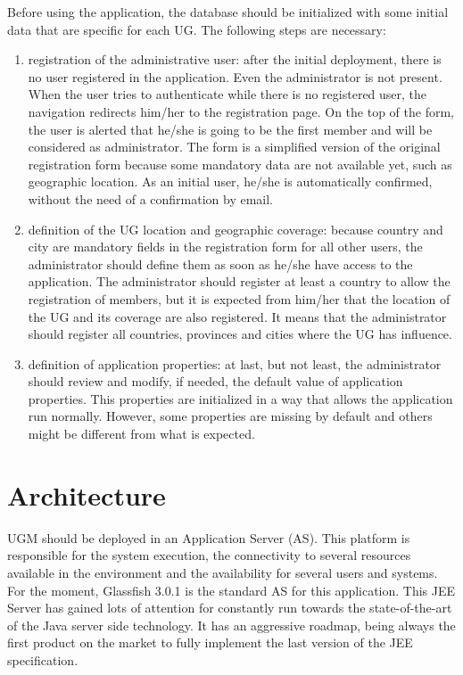 \documentclass[envcountsame,envcountchap]{svmono}
\begin{document}
Before using the application, the database should be initialized with some initial data that are specific for each UG. The following steps are necessary:

\begin{enumerate}
\item registration of the administrative user: after the initial deployment, there is no user registered in the application. Even the administrator is not present. When the user tries to authenticate while there is no registered user, the navigation redirects him/her to the registration page. On the top of the form, the user is alerted that he/she is going to be the first member and will be considered as administrator. The form is a simplified version of the original registration form because some mandatory data are not available yet, such as geographic location. As an initial user, he/she is automatically confirmed, without the need of a confirmation by email.
\item definition of the UG location and geographic coverage: because country and city are mandatory fields in the registration form for all other users, the administrator should define them as soon as he/she have access to the application. The administrator should register at least a country to allow the registration of members, but it is expected from him/her that the location of the UG and its coverage are also registered. It means that the administrator should register all countries, provinces and cities where the UG has influence.
\item definition of application properties: at last, but not least, the administrator should review and modify, if needed, the default value of application properties. This properties are initialized in a way that allows the application run normally. However, some properties are missing by default and others might be different from what is expected.
\end{enumerate}

\chapter{Architecture}

UGM should be deployed in an Application Server (AS). This platform is responsible for the system execution, the connectivity to several resources available in the environment and the availability for several users and systems. For the moment, Glassfish 3.0.1 is the standard AS for this application. This JEE Server has gained lots of attention for constantly run towards the state-of-the-art of the Java server side technology. It has an aggressive roadmap, being always the first product on the market to fully implement the last version of the JEE specification.
\end{document}
